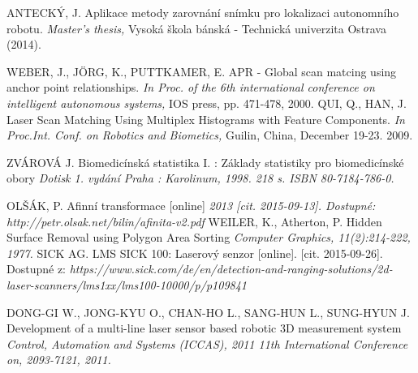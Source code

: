 \begin{thebibliography}{99}
 ANTECKÝ, J.
Aplikace metody zarovnání snímku pro lokalizaci autonomního robotu.
\textit{Master’s thesis,}
Vysoká škola bánská - Technická univerzita Ostrava (2014).


 WEBER, J., JÖRG, K., PUTTKAMER, E.
APR - Global scan matcing using anchor point relationships.
\textit{In Proc. of the 6th international conference on intelligent autonomous systems,} IOS press, pp. 471-478, 2000.
 QUI, Q., HAN, J.
Laser Scan Matching Using Multiplex Histograms with Feature Components.
\textit{In Proc.Int. Conf. on Robotics and Biometics,} Guilin, China, December 19-23. 2009.

 ZVÁROVÁ J.
Biomedicínská statistika I. : Základy statistiky pro biomedicínské obory
\textit{Dotisk 1. vydání Praha : Karolinum, 1998. 218 s. ISBN 80-7184-786-0.}

 OLŠÁK, P.
Afinní transformace [online]
\textit{2013 [cit. 2015-09-13]. Dostupné: http://petr.olsak.net/bilin/afinita-v2.pdf}
 WEILER, K., Atherton, P.
Hidden Surface Removal using Polygon Area Sorting
\textit{Computer Graphics, 11(2):214-222, 1977.}
 SICK AG.
LMS SICK 100: Laserový senzor [online]. [cit. 2015-09-26]. Dostupné z: 
\textit{https://www.sick.com/de/en/detection-and-ranging-solutions/2d-laser-scanners/lms1xx/lms100-10000/p/p109841}


 DONG-GI W., JONG-KYU O., CHAN-HO L., SANG-HUN L., SUNG-HYUN J.
Development of a multi-line laser sensor based robotic 3D measurement system
\textit{Control, Automation and Systems (ICCAS), 2011 11th International Conference on, 2093-7121, 2011.}


\end{thebibliography}
